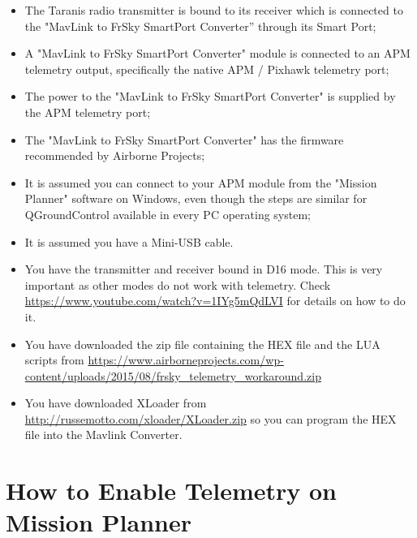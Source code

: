 \documentclass[english]{article}
\begin{document}
\begin{itemize}

\item The Taranis radio transmitter is bound to its receiver which is connected to the "MavLink
to FrSky SmartPort Converter” through its Smart Port;

\item A "MavLink to FrSky SmartPort Converter" module is connected to an APM telemetry
output, specifically the native APM / Pixhawk telemetry port;

\item The power to the "MavLink to FrSky SmartPort Converter" is supplied by the APM telemetry port;

\item The "MavLink to FrSky SmartPort Converter" has the firmware recommended by Airborne
Projects;

\item It is assumed you can connect to your APM module from the "Mission Planner" software
on Windows, even though the steps are similar for QGroundControl available in every PC
operating system;

\item It is assumed you have a Mini-USB cable.

\item You have the transmitter and receiver bound in D16 mode. This is very important as other modes do not work with telemetry. Check \url{https://www.youtube.com/watch?v=1IYg5mQdLVI} for details on how to do it.

\item You have downloaded the zip file containing the HEX file and the LUA scripts from \url{https://www.airborneprojects.com/wp-content/uploads/2015/08/frsky\_telemetry\_workaround.zip}

\item You have downloaded XLoader from \url{http://russemotto.com/xloader/XLoader.zip} so you can program the HEX file into the Mavlink Converter.

\end{itemize}

\section{How to Enable Telemetry on Mission Planner}
\end{document}
